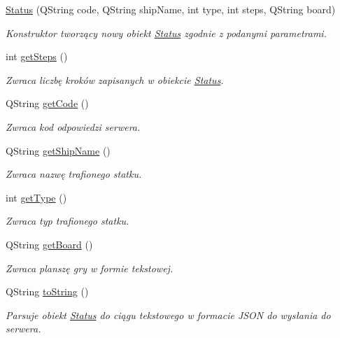 \begin{DoxyCompactItemize}
\item 
\mbox{\hyperlink{classStatus_a2a71fbd23dad1cf1496feeabfad13dc6}{Status}} (Q\+String code, Q\+String ship\+Name, int type, int steps, Q\+String board)
\begin{DoxyCompactList}\small\item\em Konstruktor tworzący nowy obiekt \mbox{\hyperlink{classStatus}{Status}} zgodnie z podanymi parametrami. \end{DoxyCompactList}\item 
int \mbox{\hyperlink{classStatus_af5e06b8a1eff42c1720c8a06b4bb5c11}{get\+Steps}} ()
\begin{DoxyCompactList}\small\item\em Zwraca liczbę kroków zapisanych w obiekcie \mbox{\hyperlink{classStatus}{Status}}. \end{DoxyCompactList}\item 
Q\+String \mbox{\hyperlink{classStatus_aece70dc1503772d16d5531b405d46c4c}{get\+Code}} ()
\begin{DoxyCompactList}\small\item\em Zwraca kod odpowiedzi serwera. \end{DoxyCompactList}\item 
Q\+String \mbox{\hyperlink{classStatus_a5f17aa5a599b9ba39c5d849f0132765f}{get\+Ship\+Name}} ()
\begin{DoxyCompactList}\small\item\em Zwraca nazwę trafionego statku. \end{DoxyCompactList}\item 
int \mbox{\hyperlink{classStatus_a340935e3e450c18898a9f676b75be4e3}{get\+Type}} ()
\begin{DoxyCompactList}\small\item\em Zwraca typ trafionego statku. \end{DoxyCompactList}\item 
Q\+String \mbox{\hyperlink{classStatus_a0b61af52cdbc7db1d82baf89c3ef937a}{get\+Board}} ()
\begin{DoxyCompactList}\small\item\em Zwraca planszę gry w formie tekstowej. \end{DoxyCompactList}\item 
Q\+String \mbox{\hyperlink{classStatus_ae86fbc75c3ebae65c26ddc4c932289e9}{to\+String}} ()
\begin{DoxyCompactList}\small\item\em Parsuje obiekt \mbox{\hyperlink{classStatus}{Status}} do ciągu tekstowego w formacie J\+S\+ON do wysłania do serwera. \end{DoxyCompactList}\item 

\end{DoxyCompactItemize}
